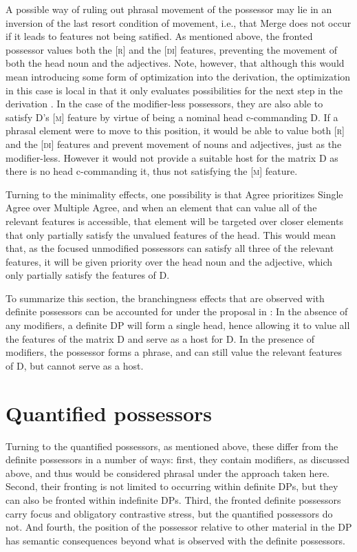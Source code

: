 \documentclass[output=paper]{langscibook}
\begin{document}
A possible way of ruling out phrasal movement of the possessor may lie in an inversion of the last resort condition of movement, i.e., that Merge does not occur if it leads to features not being satified. As mentioned above, the fronted possessor values both the [\textsc{r}] and the [\textsc{di}] features, preventing the movement of both the head noun and the adjectives. Note, however, that although this would mean introducing some form of optimization into the derivation, the optimization in this case is local in that it only evaluates possibilities for the next step in the derivation \citep[cf.][]{heck2007,Lahne:2009va}. In the case of the modifier-less possessors, they are also able to satisfy D's [\textsc{m}] feature by virtue of being a nominal head c-commanding D. If a phrasal element were to move to this position, it would be able to value both [\textsc{r}] and the [\textsc{di}] features and prevent movement of nouns and adjectives, just as the modifier-less. However it would not provide a suitable host for the matrix D as there is no head c-commanding it, thus not satisfying the [\textsc{m}] feature.

Turning to the minimality effects, one possibility is that Agree prioritizes Single Agree over Multiple Agree, and when an element that can value all of the relevant features is accessible, that element will be targeted over closer elements that only partially satisfy the unvalued features of the head. This would mean that, as the focused unmodified possessors can satisfy all three of the relevant features, it will be given priority over the head noun and the adjective, which only partially satisfy the features of D.

To summarize this section, the branchingness effects that are observed with definite possessors can be accounted for under the proposal in \citet{hardarson2020}: In the absence of any modifiers, a definite DP will form a single head, hence allowing it to value all the features of the matrix D and serve as a host for D. In the presence of modifiers, the possessor forms a phrase, and can still value the relevant features of D, but cannot serve as a host.


\section{Quantified possessors}\label{sec:hardarson:3}

Turning to the quantified possessors, as mentioned above, these differ from the definite possessors in a number of ways: first, they contain modifiers, as discussed above, and thus would be considered phrasal under the approach taken here. Second, their fronting is not limited to occurring within definite DPs, but they can also be fronted within indefinite DPs. Third, the fronted definite possessors carry focus and obligatory contrastive stress, but the quantified possessors do not. And fourth, the position of the possessor relative to other material in the DP has semantic consequences beyond what is observed with the definite possessors.
\end{document}
